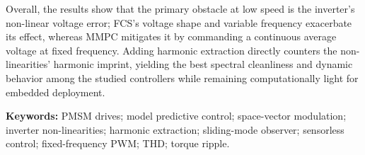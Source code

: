 Overall, the results show that the primary obstacle at low speed is the inverter’s non-linear voltage error; FCS’s voltage shape and variable frequency exacerbate its effect, whereas MMPC mitigates it by commanding a continuous average voltage at fixed frequency. Adding harmonic extraction directly counters the non-linearities’ harmonic imprint, yielding the best spectral cleanliness and dynamic behavior among the studied controllers while remaining computationally light for embedded deployment.
\medskip

\noindent\textbf{Keywords:} PMSM drives; model predictive control; space-vector modulation; inverter non-linearities; harmonic extraction; sliding-mode observer; sensorless control; fixed-frequency PWM; THD; torque ripple.



